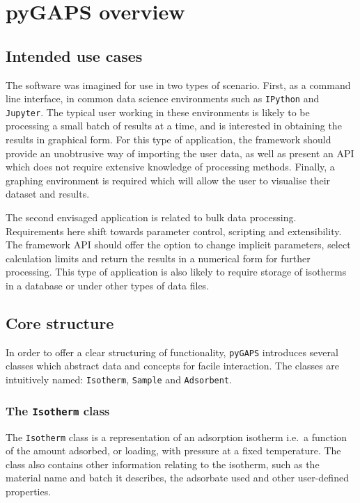 
\section{pyGAPS overview}

\subsection{Intended use cases}

The software was imagined for use in two types of scenario.
First, as a command line interface, in common data science environments
such as \texttt{IPython} and \texttt{Jupyter}. The typical user working
in these environments is likely to be processing a small batch of
results at a time, and is interested in obtaining the results in
graphical form. For this type of application, the framework should
provide an unobtrusive way of importing the user data, as well as
present an API which does not require extensive knowledge of 
processing methods. Finally, a graphing environment is
required which will allow the user to visualise their
dataset and results.

The second envisaged application is related to bulk data processing.
Requirements here shift towards parameter control, scripting and
extensibility. The framework API should offer the option to change 
implicit parameters, select calculation limits and return the results
in a numerical form for further processing. This type of application 
is also likely to require storage of isotherms in a database or
under other types of data files.

\subsection{Core structure}

In order to offer a clear structuring of functionality, 
\texttt{pyGAPS} introduces several classes which abstract data and
concepts for facile interaction. The classes are
intuitively named: \texttt{Isotherm}, \texttt{Sample} and \texttt{Adsorbent}.

\subsubsection{The \texttt{Isotherm} class}

The \texttt{Isotherm} class is a representation of an adsorption 
isotherm i.e.\ a function of the amount adsorbed, or loading, 
with pressure at a fixed temperature. The class also contains
other information relating to the isotherm, such as the material
name and batch it describes, the adsorbate used and other 
user-defined properties.

